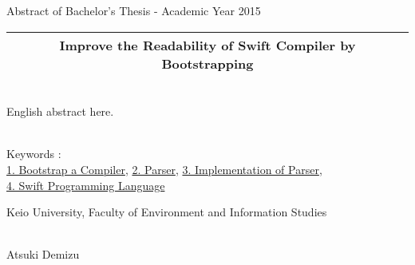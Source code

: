 Abstract of Bachelor's Thesis - Academic Year 2015
~ \\


\begin{center}
\begin{Large}
\begin{tabular}{|c|} \hline
Improve the Readability of Swift Compiler by Bootstrapping
\\
\hline
\end{tabular}
\end{Large}
\end{center}
~  \\

English abstract here.

~ \\
Keywords : \\
\underline{1. Bootstrap a Compiler},
\underline{2. Parser},
\underline{3. Implementation of Parser},\\
\underline{4. Swift Programming Language}

\begin{flushright}
Keio University, Faculty of Environment and Information Studies\\
~ \\
\begin{Large}
Atsuki Demizu
\end{Large}
\end{flushright}
